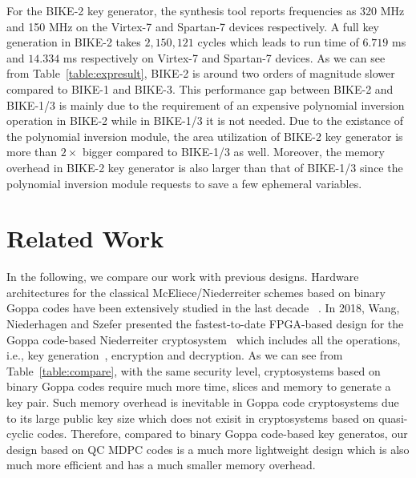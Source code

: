 \documentclass[runningheads]{llncs}
\begin{document}
For the BIKE-2 key generator, the synthesis tool reports
frequencies as 320 MHz and 150 MHz on the Virtex-7 and Spartan-7 devices respectively.
A full key generation in BIKE-2 takes $2,150,121$ cycles
which leads to run time of $6.719$ ms and $14.334$ ms respectively
on Virtex-7 and Spartan-7 devices.
As we can see from Table~\ref{table:expresult},
BIKE-2 is around two orders of magnitude slower compared to BIKE-1 and BIKE-3.
This performance gap between BIKE-2 and BIKE-1/3 is mainly
due to the requirement of an expensive polynomial inversion operation in BIKE-2
while in BIKE-1/3 it is not needed.
Due to the existance of the polynomial inversion module,
the area utilization of BIKE-2 key generator is more than $2\times$
bigger compared to BIKE-1/3 as well.
Moreover, the memory overhead in BIKE-2 key generator
is also larger than that of BIKE-1/3 since
the polynomial inversion module
requests to save a few ephemeral variables.

\section{Related Work}
In the following, we compare our work with previous designs.
Hardware architectures for the classical McEliece/Niederreiter
schemes based on binary Goppa
codes have been extensively studied in the last decade
~\cite{eisenbarth2009microeliece,shoufan2010novel,ghosh2012speed,heyse2012towards,wang2017fpga,wang2018fpga}.
In 2018, Wang, Niederhagen and Szefer presented
the fastest-to-date FPGA-based design for the
Goppa code-based Niederreiter cryptosystem~\cite{wang2018fpga}
which includes all the operations, i.e.,
key generation~\cite{wang2017fpga}, encryption and decryption.
As we can see from Table~\ref{table:compare}, with the same security level,
cryptosystems based on binary Goppa codes
require much more time, slices and memory to generate
a key pair.
Such memory overhead is inevitable in Goppa code
cryptosystems due to its large public key size
which does not exisit in cryptosystems based on
quasi-cyclic codes.
Therefore, compared to binary Goppa code-based key generatos,
our design based on QC MDPC codes is a much more lightweight
design which is also much more efficient and has a
much smaller memory overhead.
\end{document}
